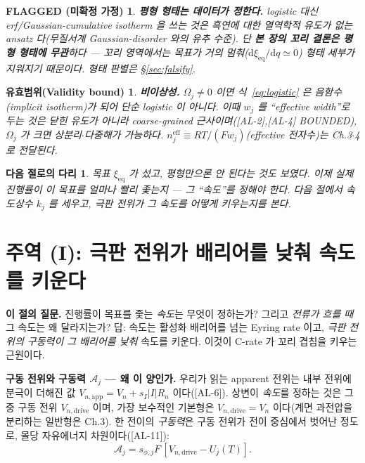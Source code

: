 \documentclass[11pt,a4paper]{article}
\newtheorem*{boundbox}{유효범위(Validity bound)}
\newtheorem*{flagbox}{FLAGGED (미확정 가정)}
\newtheorem*{bridgebox}{다음 절로의 다리}
\newcommand{\dd}{\mathrm{d}}
\newcommand{\eff}{\mathrm{eff}}
\newcommand{\eq}{\mathrm{eq}}
\newcommand{\app}{\mathrm{app}}
\newcommand{\drive}{\mathrm{drive}}
\newcommand{\AL}[1]{\textsf{[AL-#1]}}
\begin{document}
\begin{flagbox}
\textbf{평형 \emph{형태}는 데이터가 정한다.} logistic 대신 erf/Gaussian-cumulative isotherm 을 쓰는 것은
흑연에 대한 열역학적 유도가 없는 ansatz 다(무질서계 Gaussian-disorder 와의 유추 수준). 단 \textbf{본 장의
꼬리 결론은 평형 형태에 무관}하다 — 꼬리 영역에서는 목표가 거의 멈춰($\dd\xi_\eq/\dd q\simeq0$) 형태 세부가
지워지기 때문이다. 형태 판별은 \S\ref{sec:falsify}.
\end{flagbox}
\begin{boundbox}
\textbf{비이상성.} $\Omega_j\ne0$ 이면 식~\eqref{eq:logistic} 은 음함수(implicit isotherm)가 되어 단순
logistic 이 아니다. 이때 $w_j$ 를 ``effective width''로 두는 것은 닫힌 유도가 아니라 coarse-grained
근사이며(\AL{2},\AL{4} BOUNDED), $\Omega_j$ 가 크면 상분리$\cdot$다중해가 가능하다. $n_j^{\eff}\equiv
RT/(Fw_j)$(effective 전자수)는 Ch.3$\cdot$4 로 전달된다.
\end{boundbox}

\begin{bridgebox}
목표 $\xi_\eq$ 가 섰고, 평형만으론 안 된다는 것도 보였다. 이제 \emph{실제} 진행률이 이 목표를 얼마나 빨리
좇는지 — 그 ``속도''를 정해야 한다. 다음 절에서 속도상수 $k_j$ 를 세우고, \emph{극판 전위가 그 속도를
어떻게 키우는지}를 본다.
\end{bridgebox}

\section{주역 (I): 극판 전위가 배리어를 낮춰 속도를 키운다}\label{sec:rate}
\textbf{이 절의 질문.} 진행률이 목표를 좇는 \emph{속도}는 무엇이 정하는가? 그리고 \emph{전류가 흐를 때} 그
속도는 왜 달라지는가? 답: 속도는 활성화 배리어를 넘는 Eyring rate 이고, \emph{극판 전위의 구동력이 그 배리어를
낮춰} 속도를 키운다. 이것이 C-rate 가 꼬리 겹침을 키우는 근원이다.

\textbf{구동 전위와 구동력 $\mathcal A_j$ — 왜 이 양인가.} 우리가 읽는 apparent 전위는 내부 전위에 분극이
더해진 값 $V_{n,\app}=V_n+s_I|I|R_n$ 이다(\AL{6}). 상변이 \emph{속도}를 정하는 것은 그중 구동 전위
$V_{n,\drive}$ 이며, 가장 보수적인 기본형은 $V_{n,\drive}=V_n$ 이다(계면 과전압을 분리하는 일반형은 Ch.3).
한 전이의 \emph{구동력}은 구동 전위가 전이 중심에서 벗어난 정도로, 몰당 자유에너지 차원이다(\AL{11}):
\begin{equation}
\mathcal A_j=s_{\phi,j}F\,[V_{n,\drive}-U_j(T)].
\label{eq:Aj}
\end{equation}
\end{document}
